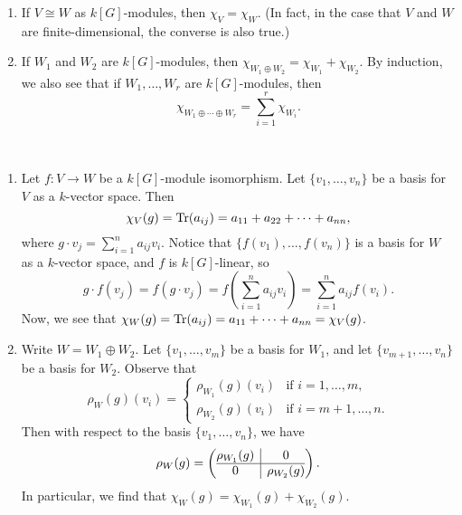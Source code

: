 \begin{remark}{}
    \begin{enumerate}[(1)]
        \item If $V \cong W$ as $k[G]$-modules, then $\chi_V = \chi_W$. 
        (In fact, in the case that $V$ and $W$ are finite-dimensional, the 
        converse is also true.)
        \item If $W_1$ and $W_2$ are $k[G]$-modules, then 
        $\chi_{W_1\oplus W_2} = \chi_{W_1} + \chi_{W_2}$. By induction, we 
        also see that if $W_1, \dots, W_r$ are $k[G]$-modules, then 
        \[ \chi_{W_1 \oplus \cdots \oplus W_r} = \sum_{i=1}^r \chi_{W_i}. \] 
    \end{enumerate}
\end{remark}
\begin{pf}~
    \begin{enumerate}[(1)]
        \item Let $f : V \to W$ be a $k[G]$-module isomorphism. Let 
        $\{v_1, \dots, v_n\}$ be a basis for $V$ as a $k$-vector space. Then 
        \[ \chi_V(g) = \operatorname{Tr}(a_{ij}) = a_{11} + a_{22} + \cdots + a_{nn}, \] 
        where $g \cdot v_j = \sum_{i=1}^n a_{ij} v_i$. Notice that 
        $\{f(v_1), \dots, f(v_n)\}$ is a basis for $W$ as a $k$-vector space, 
        and $f$ is $k[G]$-linear, so 
        \[ g \cdot f(v_j) = f(g \cdot v_j) = f \left( \sum_{i=1}^n 
        a_{ij} v_i \right) = \sum_{i=1}^n a_{ij} f(v_i). \] 
        Now, we see that $\chi_W(g) = \operatorname{Tr}(a_{ij}) = a_{11} + \cdots + a_{nn} 
        = \chi_V(g)$. 
        \item Write $W = W_1 \oplus W_2$. Let $\{v_1, \dots, v_m\}$ be a basis 
        for $W_1$, and let $\{v_{m+1}, \dots, v_n\}$ be a basis for $W_2$. 
        Observe that 
        \[ \rho_W(g)(v_i) = \begin{cases} \rho_{W_1}(g)(v_i) & \text{if } 
            i = 1, \dots, m, \\ \rho_{W_2}(g)(v_i) & \text{if } i = 
            m+1, \dots, n. \end{cases} \] 
        Then with respect to the basis $\{v_1, \dots, v_n\}$, we have 
        \[ \rho_W(g) = \left(\begin{array}{@{}c|c@{}}
            \rho_{W_1}(g) & 0 \\\hline
            0 & \rho_{W_2}(g)
          \end{array}\right). \]
        In particular, we find that $\chi_W(g) = \chi_{W_1}(g) + \chi_{W_2}(g)$. 
        \qedhere 
    \end{enumerate}
\end{pf}

